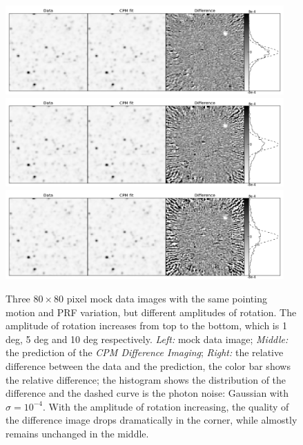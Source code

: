 \documentclass[12pt, preprint]{aastex}
\newcommand{\project}[1]{\textsl{#1}}
\newcommand{\cpmdiff}{\project{CPM Difference Imaging}}
\begin{document}
\begin{figure}[p]
\begin{center}
\includegraphics[width=0.95\textwidth]{f8a}
\includegraphics[width=0.95\textwidth]{f8b}
\includegraphics[width=0.95\textwidth]{f8c}
\end{center}
\caption{
  \label{large_rotation}
  Three $80\times 80$ pixel mock data images with the same pointing motion and PRF variation, but different amplitudes of rotation. The amplitude of rotation increases from top to the bottom, which is 1 deg, 5 deg and 10 deg respectively.
  \emph{Left:} mock data image;
  \emph{Middle:} the prediction of the \cpmdiff;
  \emph{Right:} the relative difference between the data and the prediction, the color bar shows the relative difference; the histogram shows the distribution of the difference and the dashed curve is the photon noise: Gaussian with $\sigma = 10^{-4}$. 
  With the amplitude of rotation increasing, the quality of the difference image drops dramatically in the corner, while almostly remains unchanged in the middle.
}
\end{figure}
\end{document}
